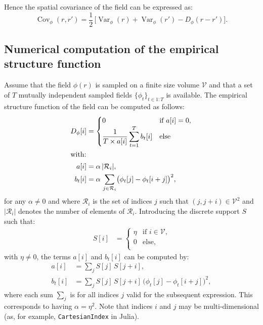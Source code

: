 \documentclass{article}
\DeclareMathOperator{\Var}{Var}
\DeclareMathOperator{\Cov}{Cov}
\begin{document}
Hence the spatial covariance of the field can be expressed as:
\begin{equation}
  \label{eq:Cov-phi}
  \Cov_{\phi}(r,r') = \frac12\,\bigl[
    \Var_{\phi}(r) + \Var_{\phi}(r') - D_{\phi}(r - r')
  \bigr].
\end{equation}


\subsection{Numerical computation of the empirical structure function}

Assume that the field $\phi(r)$ is sampled on a finite size volume
$\mathcal{V}$ and that a set of $T$ mutually independent sampled fields
$\{\phi_{t}\}_{t \in 1:T}$ is available. The empirical structure function
of the field can be computed as follows:
\begin{align}
  D_{\phi}[i]
  &= \begin{cases}
       0 & \text{if $a[i] = 0$,}\\
       \displaystyle \frac{1}{T \times a[i]}
       \sum_{t=1}^{T} b_{t}[i] & \text{else}\\
     \end{cases}\\
  \intertext{with:}
  a[i] &= \alpha\,|\mathcal{R}_i|, \\
  b_{t}[i] &= \alpha\,\sum_{j \in \mathcal{R}_i}
             \bigl(\phi_{t}[j] - \phi_{t}[i+j]\bigr)^{2},
\end{align}
for any $\alpha \not= 0$ and where $\mathcal{R}_i$ is the set of indices $j$
such that $(j,j+i)\in\mathcal{V}^{2}$ and $|\mathcal{R}_i|$ denotes the number
of elements of $\mathcal{R}_i$. Introducing the discrete support $S$ such that:
\begin{align}
  S[i]
  &= \begin{cases}
       \eta & \text{if $i \in \mathcal{V}$,}\\
       0 & \text{else,}\\
     \end{cases}
\end{align}
with $\eta \not= 0$, the terms $a[i]$ and $b_{t}[i]$ can be computed by:
\begin{align}
  \label{eq:naive_a}
  a[i] &= \sum\nolimits_{j} S[j]\,S[j+i],\\
  \label{eq:naive_b}
  b_{t}[i] &= \sum\nolimits_{j} S[j]\,S[j+i]\,
             \bigl(\phi_{t}[j] - \phi_{t}[i+j]\bigr)^{2},
\end{align}
where each sum $\sum\nolimits_{j}$ is for all indices $j$ valid for the
subsequent expression. This corresponds to having $\alpha = \eta^{2}$.
Note that indices $i$ and $j$ may be multi-dimensional (as, for example,
\texttt{CartesianIndex} in Julia).
\end{document}
